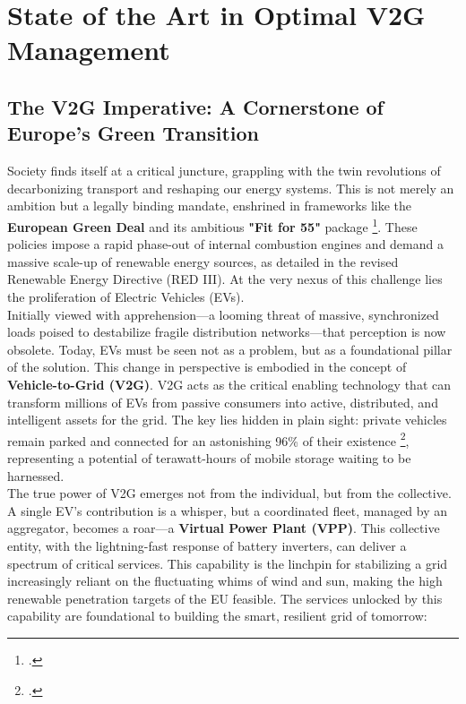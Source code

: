 \chapter{State of the Art in Optimal V2G Management}

\section{The V2G Imperative: A Cornerstone of Europe's Green Transition}
Society finds itself at a critical juncture, grappling with the twin revolutions of decarbonizing transport and reshaping our energy systems. This is not merely an ambition but a legally binding mandate, enshrined in frameworks like the \textbf{European Green Deal} and its ambitious \textbf{"Fit for 55"} package \footcite{european_commission_2021_fit_for_55}. These policies impose a rapid phase-out of internal combustion engines and demand a massive scale-up of renewable energy sources, as detailed in the revised Renewable Energy Directive (RED III). At the very nexus of this challenge lies the proliferation of Electric Vehicles (EVs).
\\
\noindent
Initially viewed with apprehension—a looming threat of massive, synchronized loads poised to destabilize fragile distribution networks—that perception is now obsolete. Today, EVs must be seen not as a problem, but as a foundational pillar of the solution. This change in perspective is embodied in the concept of \textbf{Vehicle-to-Grid (V2G)}. V2G acts as the critical enabling technology that can transform millions of EVs from passive consumers into active, distributed, and intelligent assets for the grid. The key lies hidden in plain sight: private vehicles remain parked and connected for an astonishing 96\% of their existence \footcite{evertsson2024investigating}, representing a potential of terawatt-hours of mobile storage waiting to be harnessed.
\\
\noindent
The true power of V2G emerges not from the individual, but from the collective. A single EV's contribution is a whisper, but a coordinated fleet, managed by an aggregator, becomes a roar—a \textbf{Virtual Power Plant (VPP)}. This collective entity, with the lightning-fast response of battery inverters, can deliver a spectrum of critical services. This capability is the linchpin for stabilizing a grid increasingly reliant on the fluctuating whims of wind and sun, making the high renewable penetration targets of the EU feasible. The services unlocked by this capability are foundational to building the smart, resilient grid of tomorrow:
